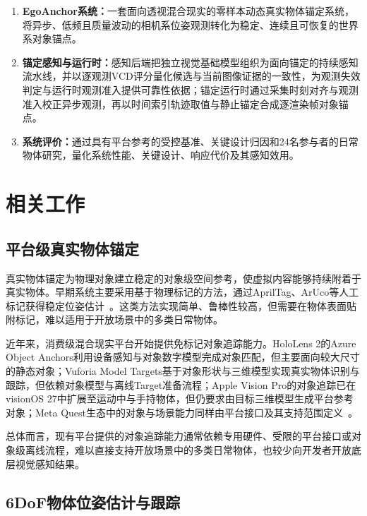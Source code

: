 \documentclass[review]{vgtc}
\begin{document}
\begin{enumerate}
  \item \textbf{EgoAnchor系统：}一套面向透视混合现实的零样本动态真实物体锚定系统，将异步、低频且质量波动的相机系位姿观测转化为稳定、连续且可恢复的世界系对象锚点。

  \item \textbf{锚定感知与运行时：}感知后端把独立视觉基础模型组织为面向锚定的持续感知流水线，并以逐观测VCD评分量化候选与当前图像证据的一致性，为观测失效判定与运行时观测准入提供可靠性依据；锚定运行时通过采集时刻对齐与观测准入校正异步观测，再以时间索引轨迹取值与静止锚定合成逐渲染帧对象锚点。

  \item \textbf{系统评价：}通过具有平台参考的受控基准、关键设计归因和24名参与者的日常物体研究，量化系统性能、关键设计、响应代价及其感知效用。
\end{enumerate}

\section{相关工作}\label{sec:related-work}

\subsection{平台级真实物体锚定}

真实物体锚定为物理对象建立稳定的对象级空间参考，使虚拟内容能够持续附着于真实物体。早期系统主要采用基于物理标记的方法，通过AprilTag、ArUco等人工标记获得稳定位姿估计~\cite{kato1999artoolkit,olson2011apriltag,garridojurado2014aruco}。这类方法实现简单、鲁棒性较高，但需要在物体表面贴附标记，难以适用于开放场景中的多类日常物体。

近年来，消费级混合现实平台开始提供免标记对象追踪能力。HoloLens 2的Azure Object Anchors利用设备感知与对象数字模型完成对象匹配，但主要面向较大尺寸的静态对象；Vuforia Model Targets基于对象形状与三维模型实现真实物体识别与跟踪，但依赖对象模型与离线Target准备流程；Apple Vision Pro的对象追踪已在visionOS 27中扩展至运动中与手持物体，但仍要求由目标三维模型生成平台参考对象；Meta Quest生态中的对象与场景能力同样由平台接口及其支持范围定义~\cite{appleObjectAnchor,appleObjectTracking2026,azureObjectAnchors,vuforiaModelTargets,metaDynamicObjectTracker}。

总体而言，现有平台提供的对象追踪能力通常依赖专用硬件、受限的平台接口或对象级离线流程，难以直接支持开放场景中的多类日常物体，也较少向开发者开放底层视觉感知结果。

\subsection{6DoF物体位姿估计与跟踪}
\end{document}
